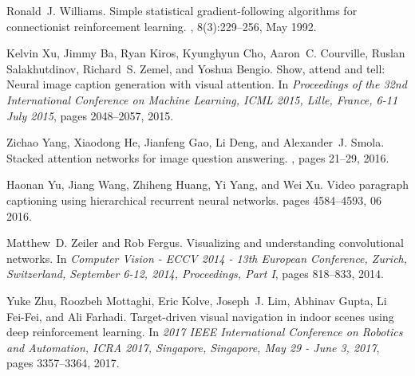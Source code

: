 \documentclass[10pt,twocolumn,letterpaper]{article}
\begin{document}
\begin{thebibliography}{10}
Ronald~J. Williams.
\newblock Simple statistical gradient-following algorithms for connectionist
  reinforcement learning.
, 8(3):229--256, May 1992.

Kelvin Xu, Jimmy Ba, Ryan Kiros, Kyunghyun Cho, Aaron~C. Courville, Ruslan
  Salakhutdinov, Richard~S. Zemel, and Yoshua Bengio.
\newblock Show, attend and tell: Neural image caption generation with visual
  attention.
\newblock In {\em Proceedings of the 32nd International Conference on Machine
  Learning, {ICML} 2015, Lille, France, 6-11 July 2015}, pages 2048--2057,
  2015.

Zichao Yang, Xiaodong He, Jianfeng Gao, Li Deng, and Alexander~J. Smola.
\newblock Stacked attention networks for image question answering.
, pages 21--29, 2016.

Haonan Yu, Jiang Wang, Zhiheng Huang, Yi Yang, and Wei Xu.
\newblock Video paragraph captioning using hierarchical recurrent neural
  networks.
\newblock pages 4584--4593, 06 2016.

Matthew~D. Zeiler and Rob Fergus.
\newblock Visualizing and understanding convolutional networks.
\newblock In {\em Computer Vision - {ECCV} 2014 - 13th European Conference,
  Zurich, Switzerland, September 6-12, 2014, Proceedings, Part {I}}, pages
  818--833, 2014.

Yuke Zhu, Roozbeh Mottaghi, Eric Kolve, Joseph~J. Lim, Abhinav Gupta, Li
  Fei{-}Fei, and Ali Farhadi.
\newblock Target-driven visual navigation in indoor scenes using deep
  reinforcement learning.
\newblock In {\em 2017 {IEEE} International Conference on Robotics and
  Automation, {ICRA} 2017, Singapore, Singapore, May 29 - June 3, 2017}, pages
  3357--3364, 2017.

\end{thebibliography}
 
\end{document}
